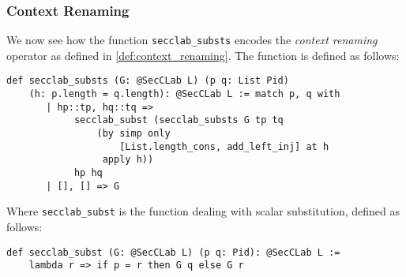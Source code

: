 \documentclass[12pt,a4paper,twoside]{book}
\begin{document}
\subsubsection{Context Renaming}
We now see how the function \texttt{secclab\_substs} encodes the \emph{context renaming} operator as defined in \ref{def:context_renaming}. The function is defined as follows:
\begin{samepage}
\begin{verbatim}
def secclab_substs (G: @SecCLab L) (p q: List Pid)
    (h: p.length = q.length): @SecCLab L := match p, q with
       | hp::tp, hq::tq =>
            secclab_subst (secclab_substs G tp tq
                (by simp only 
                    [List.length_cons, add_left_inj] at h
                 apply h))
            hp hq
       | [], [] => G
\end{verbatim}
\end{samepage}
Where \texttt{secclab\_subst} is the function dealing with scalar substitution, defined as follows:
\begin{samepage}
\begin{verbatim}
def secclab_subst (G: @SecCLab L) (p q: Pid): @SecCLab L :=
    lambda r => if p = r then G q else G r
\end{verbatim}
\end{samepage}
\end{document}
